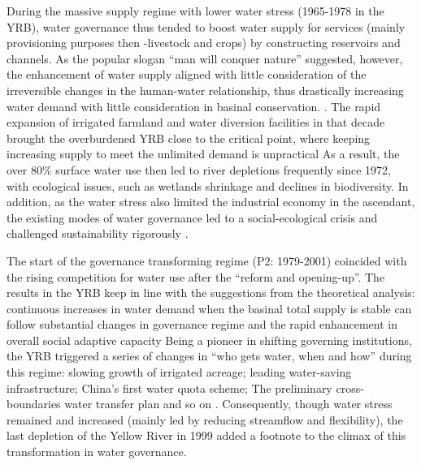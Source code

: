 During the massive supply regime with lower water stress (1965-1978 in the YRB), water governance thus tended to boost water supply for services (mainly provisioning purposes then -livestock and crops) by constructing reservoirs and channels.
As the popular slogan ``man will conquer nature'' suggested, however, the enhancement of water supply aligned with little consideration of the irreversible changes in the human-water relationship, thus drastically increasing water demand with little consideration in basinal conservation.
\cite{zhouDecelerationChinahuman2020}.
The rapid expansion of irrigated farmland and water diversion facilities in that decade brought the overburdened YRB close to the critical point, where keeping increasing supply to meet the unlimited demand is unpractical
As a result, the over 80\% surface water use then led to river depletions frequently since 1972, with ecological issues, such as wetlands shrinkage and declines in biodiversity.
In addition, as the water stress also limited the industrial economy in the ascendant, the existing modes of water governance led to a social-ecological crisis and challenged sustainability rigorously
\cite{wohlfartRiverBasinCourse2016}.

The start of the governance transforming regime (P2: 1979-2001) coincided with the rising competition for water use after the ``reform and opening-up''.
The results in the YRB keep in line with the suggestions from the theoretical analysis: continuous increases in water demand when the basinal total supply is stable can follow substantial changes in governance regime and the rapid enhancement in overall social adaptive capacity %
Being a pioneer in shifting governing institutions, the YRB triggered a series of changes in ``who gets water, when and how'' during this regime: slowing growth of irrigated acreage; leading water-saving infrastructure; China's first water quota scheme; The preliminary cross-boundaries water transfer plan and so on
\cite{wangThirtyYearsYellow2018}.
Consequently, though water stress remained and increased (mainly led by reducing streamflow and flexibility), the last depletion of the Yellow River in 1999 added a footnote to the climax of this transformation in water governance.

